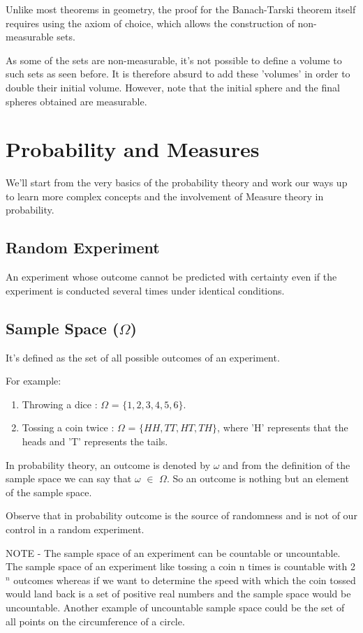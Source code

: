 \documentclass{article}
\begin{document}
Unlike most theorems in geometry, the proof for the Banach-Tarski theorem itself requires using the axiom of choice, which allows the construction of non-measurable sets.\medskip

As some of the sets are non-measurable, it's not possible to define a volume to such sets as seen before. It is therefore absurd to add these 'volumes' in order to double their initial volume. However, note that the initial sphere and the final spheres obtained are measurable.
\newpage
\section{Probability and Measures}


We'll start from the very basics of the probability theory and work our ways up to learn more complex concepts and the involvement of Measure theory in probability.

\subsection{Random Experiment}

An experiment whose outcome cannot be predicted with certainty even if the experiment is conducted several times under identical conditions.

\subsection{Sample Space ($\Omega$)}
    
It's defined as the set of all possible outcomes of an experiment.

For example:
\begin{enumerate}
    \item Throwing a dice : $\Omega$ = $\{1,2,3,4,5,6\}.$
    \item  Tossing a coin twice : $\Omega$ = $\{HH, TT, HT, TH\}$, where 'H' represents that the heads and 'T' represents the tails.
\end{enumerate}


In probability theory, an outcome is denoted by $\omega$ and from the definition of the sample space we can say that $\omega$ $\in$ $\Omega$.
So an outcome is nothing but an element of the sample space.

Observe that in probability outcome is the source of randomness and is not of our control in a random experiment.
\bigskip

NOTE - The sample space of an experiment can be countable or uncountable. The sample space of an experiment like tossing a coin n times is countable with 2$^{n}$ outcomes whereas if we want to determine the speed with which the coin tossed would land back is a set of positive real numbers and the sample space would be uncountable. Another example of uncountable sample space could be the set of all points on the circumference of a circle.\bigskip
\end{document}

